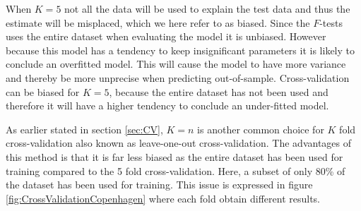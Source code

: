 When $K = 5$ not all the data will be used to explain the test data and thus the estimate will be misplaced, which we here refer to as biased. 
Since the $F$-tests uses the entire dataset when evaluating the model it is unbiased. 
However because this model has a tendency to keep insignificant parameters it is likely to conclude an overfitted model. 
This will cause the model to have more variance and thereby be more unprecise when predicting out-of-sample. 
Cross-validation can be biased for $K = 5$, because the entire dataset has not been used and therefore it will have a higher tendency to conclude an under-fitted model.



As earlier stated in section \ref{sec:CV}, $K = n$ is another common choice for $K$ fold cross-validation also known as leave-one-out cross-validation.
The advantages of this method is that it is far less biased as the entire dataset has been used for training compared to the 5 fold cross-validation.
Here, a subset of only 80\% of the dataset has been used for training.
This issue is expressed in figure \ref{fig:CrossValidationCopenhagen} where each fold obtain different results.

